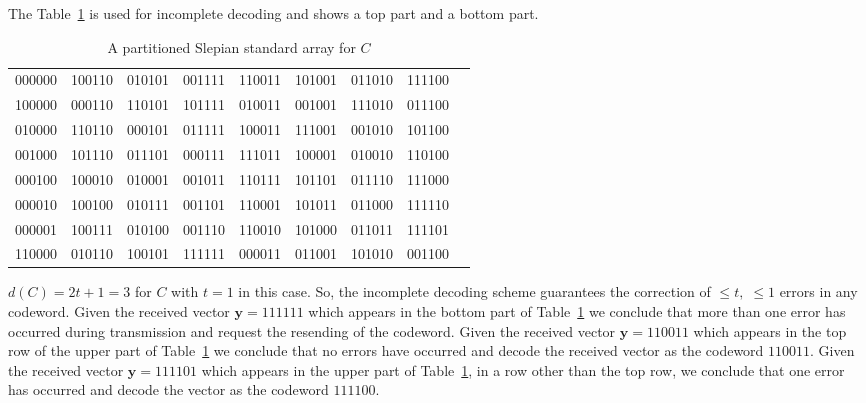 The Table~\ref{tab:15} is used for incomplete decoding and shows a top part and a bottom part.
\begin{table}[!htp]\centering
\begin{tabular}{lrrrrrrrr}\toprule
000000 &100110 &010101 &001111 &110011 &101001 &011010 &111100 \\
100000 &000110 &110101 &101111 &010011 &001001 &111010 &011100 \\
010000 &110110 &000101 &011111 &100011 &111001 &001010 &101100 \\
001000 &101110 &011101 &000111 &111011 &100001 &010010 &110100 \\
000100 &100010 &010001 &001011 &110111 &101101 &011110 &111000 \\
000010 &100100 &010111 &001101 &110001 &101011 &011000 &111110 \\
000001 &100111 &010100 &001110 &110010 &101000 &011011 &111101 \\
\midrule
110000 &010110 &100101 &111111 &000011 &011001 &101010 &001100 \\
\bottomrule
\end{tabular}
\caption{A partitioned Slepian standard array for $C$}\label{tab:15}
\end{table}
$d(C) = 2t + 1 =3$ for $C$ with $t=1$ in this case. So, the incomplete decoding scheme guarantees the correction of $\leq t,\; \leq 1$ errors in any codeword.
\qsubpart
Given the received vector $\bm{y} = 111111$ which appears in the bottom part of Table~\ref{tab:15} we conclude that more than one error has occurred during transmission and request the resending of the codeword.
\qsubpart
Given the received vector $\bm{y} =110011$ which appears in the top row of the upper part of Table~\ref{tab:15} we conclude that no errors have occurred and decode the received vector as the codeword $110011$.
\qsubpart
Given the received vector $\bm{y} = 111101$ which appears in the upper part of Table~\ref{tab:15}, in a row other than the top row, we conclude that one error has occurred and decode the vector as the codeword $111100$.